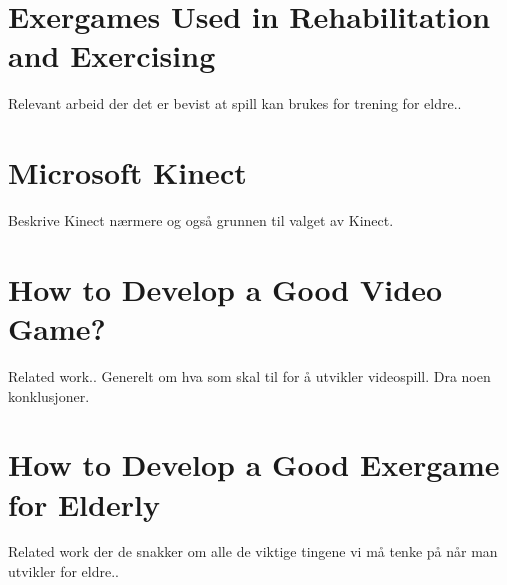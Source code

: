 \section{Exergames Used in Rehabilitation and Exercising}
Relevant arbeid der det er bevist at spill kan brukes for trening for eldre.. 
\section{Microsoft Kinect}
Beskrive Kinect nærmere og også grunnen til valget av Kinect. 
\section{How to Develop a Good Video Game?}
Related work.. Generelt om hva som skal til for å utvikler videospill. Dra noen konklusjoner.
\section{How to Develop a Good Exergame for Elderly}
Related work der de snakker om alle de viktige tingene vi må tenke på når man utvikler for eldre..

